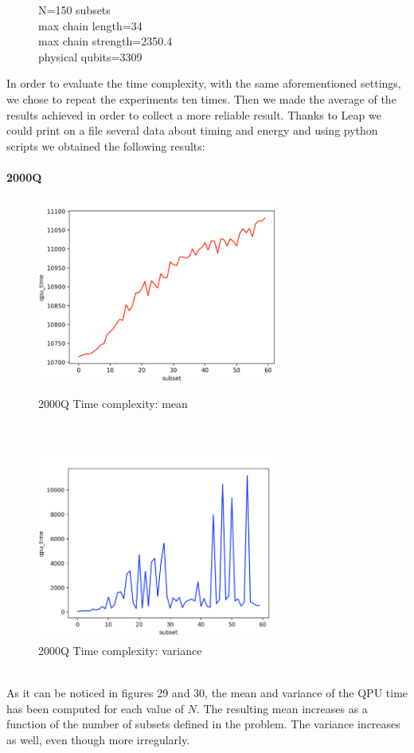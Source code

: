 \documentclass[oneside,a4paper]{article}
\begin{document}
\begin{figure}[htp]
\begin{minipage}[b]{4.5cm}
\caption{N=150 subsets\\max chain length=34\\max chain strength=2350.4\\physical qubits=3309}
\end{minipage}
\end{figure}

\newpage
In order to evaluate the time complexity, with the same aforementioned settings, we chose to repeat the experiments ten times. Then we made the average of the results achieved in order to collect a more reliable result. Thanks to Leap we could print on a file several data about timing and energy and using python scripts we obtained the following results:\\
\\
\textbf{2000Q}
\begin{figure}[htp]
\begin{minipage}[b]{7.5cm}
\centering
\includegraphics[width=8cm]{LaTeXTemplate/Images/2000QTimeComplexity.png}
\caption{2000Q Time complexity: mean}
\end{minipage}
\ \hspace{2mm} \hspace{2mm} \
\begin{minipage}[b]{9cm}
\centering
\includegraphics[width=8cm]{LaTeXTemplate/Images/2000QTimeVariance.png}
\caption{2000Q Time complexity: variance}
\end{minipage}
\end{figure}\\
As it can be noticed in figures 29 and 30, the mean and variance of the QPU time has been computed for each value of $N$. The resulting mean increases as a function of the number of subsets defined in the problem. The variance increases as well, even though more irregularly.
\end{document}
